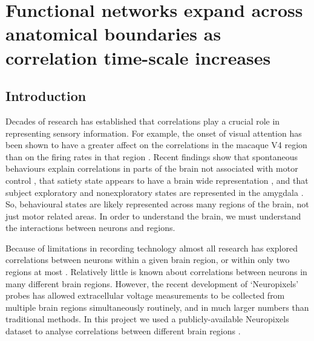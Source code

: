 \chapter{Functional networks expand across anatomical boundaries as correlation time-scale increases}

\label{chap:eight_probe}


\section{Introduction}
Decades of research has established that correlations play a crucial role in representing sensory information. For example, the onset of visual attention has been shown to have a greater affect on the correlations in the macaque V4 region than on the firing rates in that region  \parencite{cohen1}. Recent findings show that spontaneous behaviours explain correlations in parts of the brain not associated with motor control \parencite{stringer}, that satiety state appears to have a brain wide representation \parencite{allen}, and that subject exploratory and nonexploratory states are represented in the amygdala \parencite{grundemann}. So, behavioural states are likely represented across many regions of the brain, not just motor related areas. In order to understand the brain, we must understand the interactions between neurons and regions.

Because of limitations in recording technology almost all research has explored correlations between neurons within a given brain region, or within only two regions at most \parencite{wierzynski, patterson, girard}. Relatively little is known about correlations between neurons in many different brain regions. However, the recent development of `Neuropixels' probes  \parencite{jun} has allowed extracellular voltage measurements to be collected from multiple brain regions simultaneously routinely, and in much larger numbers than traditional methods. In this project we used a publicly-available Neuropixels dataset to analyse correlations between different brain regions  \parencite{stringer}.


